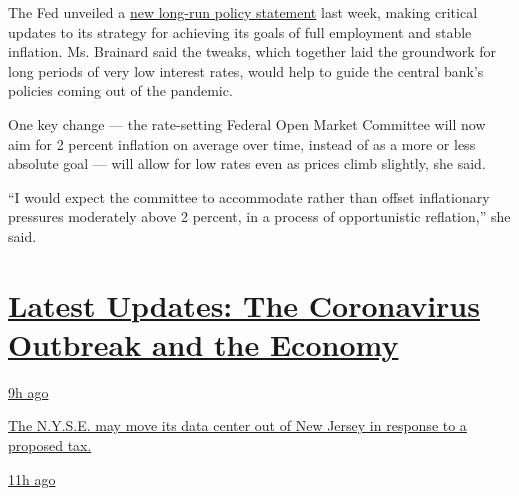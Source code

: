 The Fed unveiled a
\href{https://www.nytimes3xbfgragh.onion/2020/08/27/business/economy/federal-reserve-inflation-jerome-powell.html}{new
long-run policy statement} last week, making critical updates to its
strategy for achieving its goals of full employment and stable
inflation. Ms. Brainard said the tweaks, which together laid the
groundwork for long periods of very low interest rates, would help to
guide the central bank's policies coming out of the pandemic.

One key change --- the rate-setting Federal Open Market Committee will
now aim for 2 percent inflation on average over time, instead of as a
more or less absolute goal --- will allow for low rates even as prices
climb slightly, she said.

``I would expect the committee to accommodate rather than offset
inflationary pressures moderately above 2 percent, in a process of
opportunistic reflation,'' she said.

\hypertarget{latest-updates-the-coronavirus-outbreak-and-the-economy}{%
\section{\texorpdfstring{\href{https://www.nytimes3xbfgragh.onion/live/2020/09/11/business/stock-market-today-coronavirus?action=click\&pgtype=Article\&state=default\&region=MAIN_CONTENT_1\&context=storylines_live_updates}{Latest
Updates: The Coronavirus Outbreak and the
Economy}}{Latest Updates: The Coronavirus Outbreak and the Economy}}\label{latest-updates-the-coronavirus-outbreak-and-the-economy}}

\href{https://www.nytimes3xbfgragh.onion/live/2020/09/11/business/stock-market-today-coronavirus?action=click\&pgtype=Article\&state=default\&region=MAIN_CONTENT_1\&context=storylines_live_updates\#the-nyse-may-move-its-data-center-out-of-new-jersey-in-response-to-a-proposed-tax}{9h
ago}

\href{https://www.nytimes3xbfgragh.onion/live/2020/09/11/business/stock-market-today-coronavirus?action=click\&pgtype=Article\&state=default\&region=MAIN_CONTENT_1\&context=storylines_live_updates\#the-nyse-may-move-its-data-center-out-of-new-jersey-in-response-to-a-proposed-tax}{The
N.Y.S.E. may move its data center out of New Jersey in response to a
proposed tax.}

\href{https://www.nytimes3xbfgragh.onion/live/2020/09/11/business/stock-market-today-coronavirus?action=click\&pgtype=Article\&state=default\&region=MAIN_CONTENT_1\&context=storylines_live_updates\#the-federal-budget-deficit-hit-3-trillion-as-of-august}{11h
ago}

